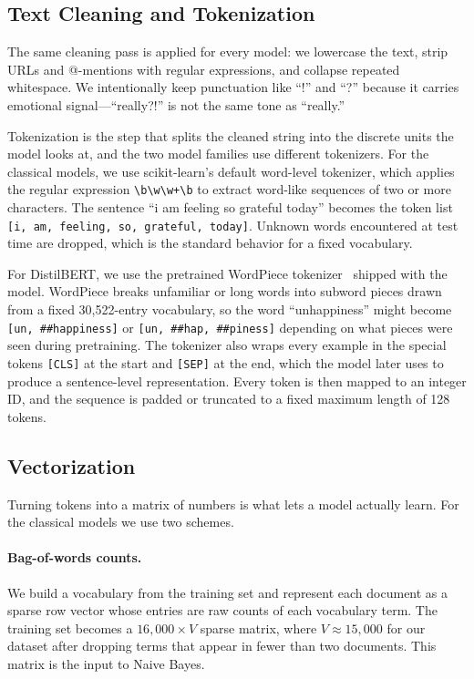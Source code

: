 \documentclass{article}
\theoremstyle{plain}
\begin{document}
\subsection{Text Cleaning and Tokenization}
\label{sec:tokenization}

The same cleaning pass is applied for every model: we lowercase the text,
strip URLs and @-mentions with regular expressions, and collapse repeated
whitespace. We intentionally keep punctuation like ``!'' and ``?'' because
it carries emotional signal---``really?!'' is not the same tone as
``really.''

Tokenization is the step that splits the cleaned string into the discrete
units the model looks at, and the two model families use different
tokenizers. For the classical models, we use scikit-learn's
\cite{pedregosa2011scikit} default word-level tokenizer, which applies the
regular expression \verb|\b\w\w+\b| to extract word-like sequences of two
or more characters. The sentence ``i am feeling so grateful today'' becomes
the token list \texttt{[i, am, feeling, so, grateful, today]}. Unknown
words encountered at test time are dropped, which is the standard behavior
for a fixed vocabulary.

For DistilBERT, we use the pretrained WordPiece
tokenizer~\cite{schuster2012wordpiece} shipped with the model. WordPiece
breaks unfamiliar or long words into subword pieces drawn from a fixed
30{,}522-entry vocabulary, so the word ``unhappiness'' might become
\texttt{[un, \#\#happiness]} or \texttt{[un, \#\#hap, \#\#piness]} depending
on what pieces were seen during pretraining. The tokenizer also wraps every
example in the special tokens \texttt{[CLS]} at the start and \texttt{[SEP]}
at the end, which the model later uses to produce a sentence-level
representation. Every token is then mapped to an integer ID, and the
sequence is padded or truncated to a fixed maximum length of 128 tokens.

\subsection{Vectorization}
\label{sec:vectorization}

Turning tokens into a matrix of numbers is what lets a model actually
learn. For the classical models we use two schemes.

\paragraph{Bag-of-words counts.} We build a vocabulary from the training
set and represent each document as a sparse row vector whose entries are
raw counts of each vocabulary term. The training set becomes a
$16{,}000 \times V$ sparse matrix, where $V \approx 15{,}000$ for our
dataset after dropping terms that appear in fewer than two documents. This
matrix is the input to Naive Bayes.
\end{document}
